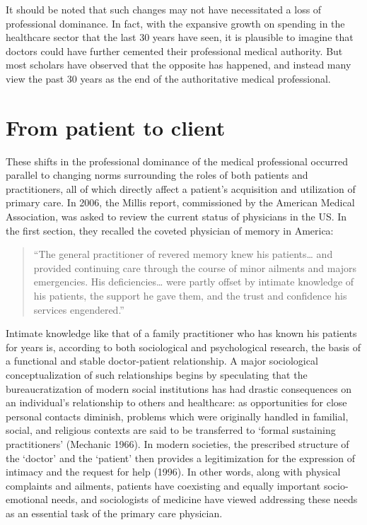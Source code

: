 \documentclass[12pt,twoside]{reedthesis}
\begin{document}
  It should be noted that such changes may not have necessitated a loss of
  professional dominance. In fact, with the expansive growth on spending
  in the healthcare sector that the last 30 years have seen, it is
  plausible to imagine that doctors could have further cemented their
  professional medical authority. But most scholars have observed that the
  opposite has happened, and instead many view the past 30 years as the
  end of the authoritative medical professional.
  
  \section*{From patient to client}\label{from-patient-to-client}
  
  These shifts in the professional dominance of the medical professional
  occurred parallel to changing norms surrounding the roles of both
  patients and practitioners, all of which directly affect a patient's
  acquisition and utilization of primary care. In 2006, the Millis report,
  commissioned by the American Medical Association, was asked to review
  the current status of physicians in the US. In the first section, they
  recalled the coveted physician of memory in America:
  
  \singlespace
  
  \begin{quote}
  ``The general practitioner of revered memory knew his patients\ldots{}
  and provided continuing care through the course of minor ailments and
  majors emergencies. His deficiencies\ldots{} were partly offset by
  intimate knowledge of his patients, the support he gave them, and the
  trust and confidence his services engendered.''
  \end{quote}
  
  \doublespacing
  
  Intimate knowledge like that of a family practitioner who has known his
  patients for years is, according to both sociological and psychological
  research, the basis of a functional and stable doctor-patient
  relationship. A major sociological conceptualization of such
  relationships begins by speculating that the bureaucratization of modern
  social institutions has had drastic consequences on an individual's
  relationship to others and healthcare: as opportunities for close
  personal contacts diminish, problems which were originally handled in
  familial, social, and religious contexts are said to be transferred to
  `formal sustaining practitioners' (Mechanic 1966). In modern societies,
  the prescribed structure of the `doctor' and the `patient' then provides
  a legitimization for the expression of intimacy and the request for help
  (1996). In other words, along with physical complaints and ailments,
  patients have coexisting and equally important socio-emotional needs,
  and sociologists of medicine have viewed addressing these needs as an
  essential task of the primary care physician.
  
\end{document}

